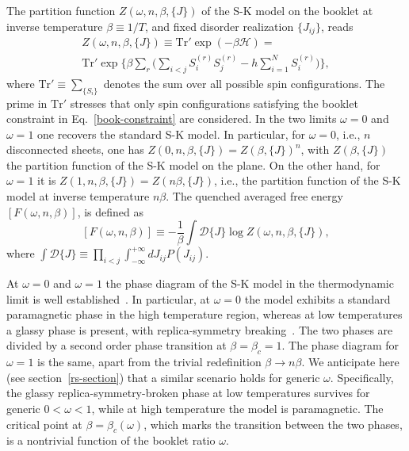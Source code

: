 \documentclass[twocolumn,superscriptaddress,prb,10pt]{revtex4-1}
\begin{document}
The partition function $Z(\omega,n,\beta,\{J\})$ of the S-K model on the booklet 
at inverse temperature $\beta\equiv 1/T$, and fixed disorder realization $\{J_{ij}\}$, 
reads 
%
\begin{multline}
Z(\omega,n,\beta,\{J\})\equiv\textrm{Tr}'\exp(-\beta{\mathcal H})=\\
\textrm{Tr}'\exp\Big\{\beta\sum\limits_{r}\Big(
\sum\limits_{i<j}S^{(r)}_i 
S^{(r)}_j-h\sum\limits_{i=1}^NS^{(r)}_i\Big)\Big\},
\label{book-pf}
\end{multline}
%
where $\textrm{Tr}'\equiv \sum_{\{S_i\}}$ denotes the sum over all possible 
spin configurations. The prime in $\textrm{Tr}'$ stresses that only spin configurations 
satisfying the booklet constraint in Eq.~\eqref{book-constraint} are considered. 
In the two limits $\omega=0$ and $\omega=1$ one recovers the standard 
S-K model. In particular, for $\omega=0$, i.e., $n$ disconnected sheets, one has 
$Z(0,n,\beta,\{J\})=Z(\beta,\{J\})^n$, with $Z(\beta,\{J\})$ the partition function 
of the S-K model on the plane. On the other hand, for $\omega=1$ it is $Z(1,n,\beta,
\{J\})=Z(n\beta,\{J\})$, i.e., the partition function of the S-K model at inverse 
temperature $n\beta$. The quenched averaged free energy $[F(\omega,n,\beta)]$, is defined 
as 
%
\begin{equation}
\label{free-energy}
[F(\omega,n,\beta)]\equiv -\frac{1}{\beta}\int {\mathcal D}\{J\}
\log Z(\omega,n,\beta,\{J\}), 
\end{equation}
%
where $\int{\mathcal D}\{J\}\equiv\prod\nolimits_{i<j}\int_{-\infty}^{
+\infty}dJ_{ij}P(J_{ij})$. 

At $\omega=0$ and $\omega=1$ the phase diagram of the S-K model in the 
thermodynamic limit is well established~\cite{nishimori-book}. In particular, 
at $\omega=0$ the model exhibits a standard paramagnetic phase in the high 
temperature region, whereas at low temperatures a glassy phase is present, 
with replica-symmetry breaking~\cite{nishimori-book}. The two phases are 
divided by a second order phase transition at $\beta=\beta_c=1$. The phase 
diagram for $\omega=1$ is the same, apart from the trivial redefinition
$\beta\to n\beta$. We anticipate here (see section~\ref{rs-section}) that 
a similar scenario holds for generic $\omega$. Specifically, the glassy 
replica-symmetry-broken phase at low temperatures survives for generic 
$0<\omega<1$, while at high temperature the model is paramagnetic. The 
critical point at $\beta=\beta_c(\omega)$, which marks the transition 
between the two phases, is a nontrivial function of the booklet ratio 
$\omega$. 
\end{document}
